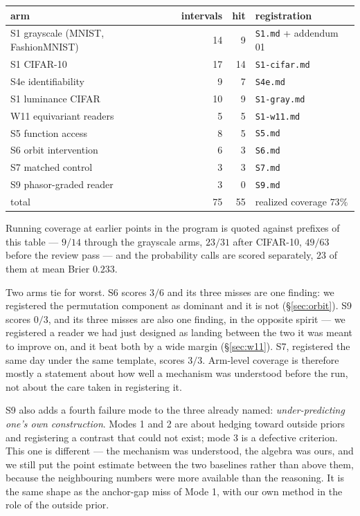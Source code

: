 \documentclass[10pt,twocolumn,letterpaper]{article}
\theoremstyle{definition}
\begin{document}
\begin{center}\small
\begin{tabular}{@{}lrrl@{}}
\toprule
arm & intervals & hit & registration \\
\midrule
S1 grayscale (MNIST, FashionMNIST) & 14 & 9 & \texttt{S1.md} + addendum 01 \\
S1 CIFAR-10                        & 17 & 14 & \texttt{S1-cifar.md} \\
S4e identifiability                & 9  & 7  & \texttt{S4e.md} \\
S1 luminance CIFAR                 & 10 & 9  & \texttt{S1-gray.md} \\
W11 equivariant readers            & 5  & 5  & \texttt{S1-w11.md} \\
S5 function access                 & 8  & 5  & \texttt{S5.md} \\
S6 orbit intervention              & 6  & 3  & \texttt{S6.md} \\
S7 matched control                 & 3  & 3  & \texttt{S7.md} \\
S9 phasor-graded reader            & 3  & 0  & \texttt{S9.md} \\
\midrule
total                              & 75 & 55 & realized coverage $73\%$ \\
\bottomrule
\end{tabular}
\end{center}

Running coverage at earlier points in the program is quoted against prefixes of this table ---
$9/14$ through the grayscale arms, $23/31$ after CIFAR-10, $49/63$ before the review pass --- and
the probability calls are scored separately, $23$ of them at mean Brier $0.233$.

Two arms tie for worst. S6 scores $3/6$ and its three misses are one finding: we registered the
permutation component as dominant and it is not (\S\ref{sec:orbit}). S9 scores $0/3$, and its three
misses are also one finding, in the opposite spirit --- we registered a reader we had just designed
as landing between the two it was meant to improve on, and it beat both by a wide margin
(\S\ref{sec:w11}). S7, registered the same day under the same template, scores $3/3$. Arm-level
coverage is therefore mostly a statement about how well a mechanism was understood before the run,
not about the care taken in registering it.

S9 also adds a fourth failure mode to the three already named: \emph{under-predicting one's own
construction}. Modes 1 and 2 are about hedging toward outside priors and registering a contrast that
could not exist; mode 3 is a defective criterion. This one is different --- the mechanism was
understood, the algebra was ours, and we still put the point estimate between the two baselines
rather than above them, because the neighbouring numbers were more available than the reasoning. It
is the same shape as the anchor-gap miss of Mode 1, with our own method in the role of the outside
prior.
\end{document}
